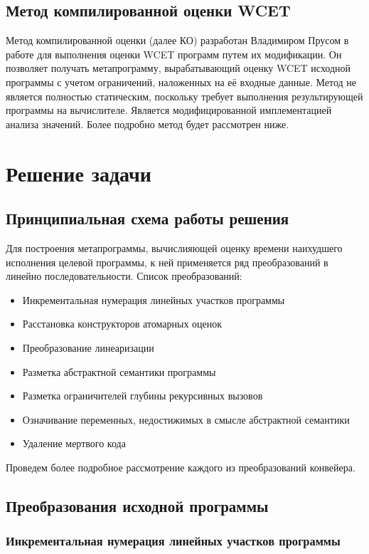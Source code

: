 \documentclass[12pt,a4paper]{article}
\begin{document}
\subsection{Метод компилированной оценки WCET}
Метод компилированной оценки (далее КО) разработан Владимиром Прусом в работе \cite{prus} для выполнения оценки WCET программ путем их модификации. Он позволяет получать метапрограмму, вырабатывающий оценку WCET исходной программы с учетом ограничений, наложенных на её входные данные. Метод не является полностью статическим, поскольку требует выполнения результирующей программы на вычислителе. Является модифицированной имплементацией анализа значений. Более подробно метод будет рассмотрен ниже.

\newpage
\section{Решение задачи}

\subsection{Принципиальная схема работы решения}

Для построения метапрограммы, вычислияющей оценку времени наихудшего исполнения целевой программы, к ней применяется ряд преобразований в линейно последовательности. Список преобразований:
\begin{itemize}
    \item Инкрементальная нумерация линейных участков программы
    \item Расстановка конструкторов атомарных оценок
    \item Преобразование линеаризации
    \item Разметка абстрактной семантики программы
    \item Разметка ограничителей глубины рекурсивных вызовов
    \item Означивание переменных, недостижимых в смысле абстрактной семантики
    \item Удаление мертвого кода
\end{itemize}

Проведем более подробное рассмотрение каждого из преобразований конвейера.

\subsection{Преобразования исходной программы}

\subsubsection{Инкрементальная нумерация линейных участков программы}
\end{document}
